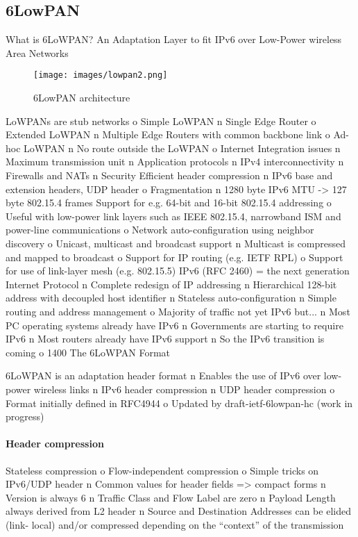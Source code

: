 \subsection{6LowPAN}
What is 6LoWPAN?
An Adaptation Layer to fit IPv6 over
Low-Power wireless Area Networks
\begin{figure}[H]
    \centering
    \texttt{[image: images/lowpan2.png]}
    \caption{6LowPAN architecture}
\end{figure}
LoWPANs are stub networks
o Simple LoWPAN
n Single Edge Router
o Extended LoWPAN
n Multiple Edge Routers with common backbone link
o Ad-hoc LoWPAN
n No route outside the LoWPAN
o Internet Integration issues
n Maximum transmission unit
n Application protocols
n IPv4 interconnectivity
n Firewalls and NATs
n Security
Efficient header compression
n IPv6 base and extension headers, UDP header
o Fragmentation
n 1280 byte IPv6 MTU -> 127 byte 802.15.4
frames
Support for e.g. 64-bit and 16-bit 802.15.4
addressing
o Useful with low-power link layers such as IEEE
802.15.4, narrowband ISM and power-line
communications
o Network auto-configuration using neighbor
discovery
o Unicast, multicast and broadcast support
n Multicast is compressed and mapped to broadcast
o Support for IP routing (e.g. IETF RPL)
o Support for use of link-layer mesh (e.g. 802.15.5)
IPv6 (RFC 2460) = the next generation Internet Protocol
n Complete redesign of IP addressing
n Hierarchical 128-bit address with decoupled host identifier
n Stateless auto-configuration
n Simple routing and address management
o Majority of traffic not yet IPv6 but...
n Most PC operating systems already have IPv6
n Governments are starting to require IPv6
n Most routers already have IPv6 support
n So the IPv6 transition is coming
o 1400%
The 6LoWPAN Format

6LoWPAN is an adaptation header format
n Enables the use of IPv6 over low-power wireless links
n IPv6 header compression
n UDP header compression
o Format initially defined in RFC4944
o Updated by draft-ietf-6lowpan-hc (work in progress)

\paragraph*{Header compression}
Stateless compression
o Flow-independent compression
o Simple tricks on IPv6/UDP
header
n Common values for header
fields => compact forms
n Version is always 6
n Traffic Class and Flow Label
are zero
n Payload Length always derived
from L2 header
n Source and Destination
Addresses can be elided (link- local) and/or compressed
depending on the “context” of
the transmission

